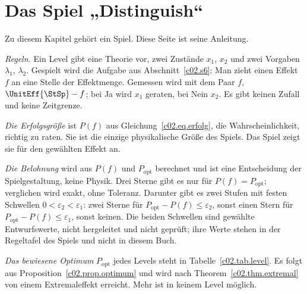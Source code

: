 \section{Das Spiel „Distinguish“}\label{c02.s7}

Zu diesem Kapitel gehört ein Spiel. Diese Seite ist seine Anleitung.

\emph{Regeln.} Ein Level gibt eine Theorie vor, zwei Zustände $x_1$, $x_2$ und zwei
Vorgaben $\lambda_1$, $\lambda_2$. Gespielt wird die Aufgabe aus Abschnitt~\ref{c02.s6}: Man
zieht einen Effekt $f$ an eine Stelle der Effektmenge. Gemessen wird mit dem Paar $f$,
$\UnitEff{\StSp} - f$; bei Ja wird $x_1$ geraten, bei Nein $x_2$. Es gibt keinen Zufall
und keine Zeitgrenze.

\emph{Die Erfolgsgröße} ist $P(f)$ aus Gleichung~\eqref{c02.eq.erfolg}, die
Wahrscheinlichkeit, richtig zu raten. Sie ist die einzige physikalische Größe des Spiels. Das Spiel
zeigt sie für den gewählten Effekt an.

\emph{Die Belohnung} wird aus $P(f)$ und $P_{\mathrm{opt}}$ berechnet und ist eine
Entscheidung der Spielgestaltung, keine Physik. Drei Sterne gibt es nur für
$P(f) = P_{\mathrm{opt}}$; verglichen wird exakt, ohne Toleranz. Darunter gibt es zwei
Stufen mit festen Schwellen $0 < \varepsilon_2 < \varepsilon_1$: zwei Sterne für
$P_{\mathrm{opt}} - P(f) \leq \varepsilon_2$, sonst einen Stern für
$P_{\mathrm{opt}} - P(f) \leq \varepsilon_1$, sonst keinen. Die beiden Schwellen sind
gewählte Entwurfswerte, nicht hergeleitet und nicht geprüft; ihre Werte stehen in der
Regeltafel des Spiels und nicht in diesem Buch.

\emph{Das bewiesene Optimum} $P_{\mathrm{opt}}$ jedes Levels steht in
Tabelle~\ref{c02.tab.level}. Es folgt aus Proposition~\ref{c02.prop.optimum} und wird nach
Theorem~\ref{c02.thm.extremal} von einem Extremaleffekt erreicht. Mehr ist in keinem Level
möglich.

